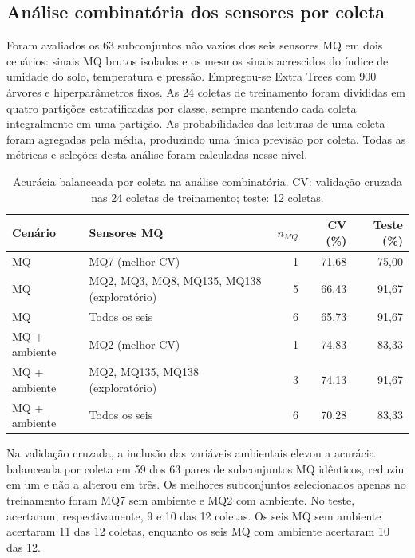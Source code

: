 \subsection{Análise combinatória dos sensores por coleta}

Foram avaliados os 63 subconjuntos não vazios dos seis sensores MQ em dois
cenários: sinais MQ brutos isolados e os mesmos sinais acrescidos do índice de
umidade do solo, temperatura e pressão. Empregou-se Extra Trees com 900 árvores
e hiperparâmetros fixos. As 24 coletas de treinamento foram divididas em quatro
partições estratificadas por classe, sempre mantendo cada coleta integralmente
em uma partição. As probabilidades das leituras de uma coleta foram agregadas
pela média, produzindo uma única previsão por coleta. Todas as métricas e
seleções desta análise foram calculadas nesse nível.

\begin{table}[htbp]
\centering
\caption{Acurácia balanceada por coleta na análise combinatória. CV:
validação cruzada nas 24 coletas de treinamento; teste: 12 coletas.}
\label{tab:combinatoria_mq_ambiente_coleta}
\begin{tabular}{llrrr}
\hline
Cenário & Sensores MQ & $n_{MQ}$ & CV (\%) & Teste (\%) \\
\hline
MQ & MQ7 (melhor CV) & 1 & 71,68 & 75,00 \\
MQ & MQ2, MQ3, MQ8, MQ135, MQ138 (exploratório) & 5 & 66,43 & 91,67 \\
MQ & Todos os seis & 6 & 65,73 & 91,67 \\
MQ + ambiente & MQ2 (melhor CV) & 1 & 74,83 & 83,33 \\
MQ + ambiente & MQ2, MQ135, MQ138 (exploratório) & 3 & 74,13 & 91,67 \\
MQ + ambiente & Todos os seis & 6 & 70,28 & 83,33 \\
\hline
\end{tabular}
\end{table}

Na validação cruzada, a inclusão das variáveis ambientais elevou a acurácia
balanceada por coleta em 59 dos 63 pares de subconjuntos MQ idênticos, reduziu
em um e não a alterou em três. Os melhores subconjuntos selecionados apenas no
treinamento foram MQ7 sem ambiente e MQ2 com ambiente. No teste, acertaram,
respectivamente, 9 e 10 das 12 coletas. Os seis MQ sem ambiente acertaram
11 das 12 coletas, enquanto os seis MQ com ambiente acertaram 10 das 12.

